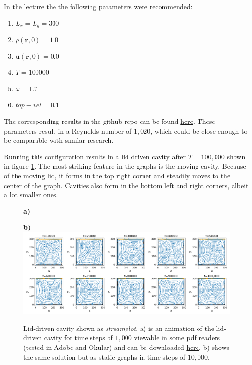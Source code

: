 In the lecture the the following parameters were recommended:
\begin{enumerate}
    \item $L_x = L_y = 300$
    \item $\rho(\textbf{r},0) = 1.0$
    \item $\textbf{u}(\textbf{r},0) = 0.0$
    \item $T = 100000$
    \item $\omega = 1.7$
    \item $top-vel = 0.1$
\end{enumerate}
The corresponding results in the github repo can be found  \href{https://github.com/jonas27/pylbm/blob/master/milestones/m6/m6.ipynb}{here}.
These parameters result in a Reynolds number of $1,020$, which could be close enough to be comparable with similar research.

Running this configuration results in a lid driven cavity  after $T=100,000$ shown in figure \ref{fig:m6-1}.
The most striking feature in the graphs is the moving cavity. Because of the moving lid, it forms in the top right corner and steadily moves to the center of the graph. 
Cavities also form in the bottom left and right corners, albeit a lot smaller ones. 

\clearpage
\begin{figure}[ht]
\centering
\textbf{\large a)}
\vspace*{2mm}

\textbf{\large b)}
\includegraphics[width=\columnwidth]{milestones/final/img/m6-1-vels.png}
\caption[Lid-driven cavity]{Lid-driven cavity shown as \textit{streamplot}. a) is an animation of the lid-driven cavity for time steps of $1,000$ viewable in some pdf readers (tested in Adobe and Okular) and can be downloaded \href{https://raw.githubusercontent.com/jonas27/pylbm/master/milestones/m6/m6.gif}{here}. b) shows the same solution but as static graphs in time steps of $10,000$. }
\label{fig:m6-1}
\end{figure}
\clearpage




